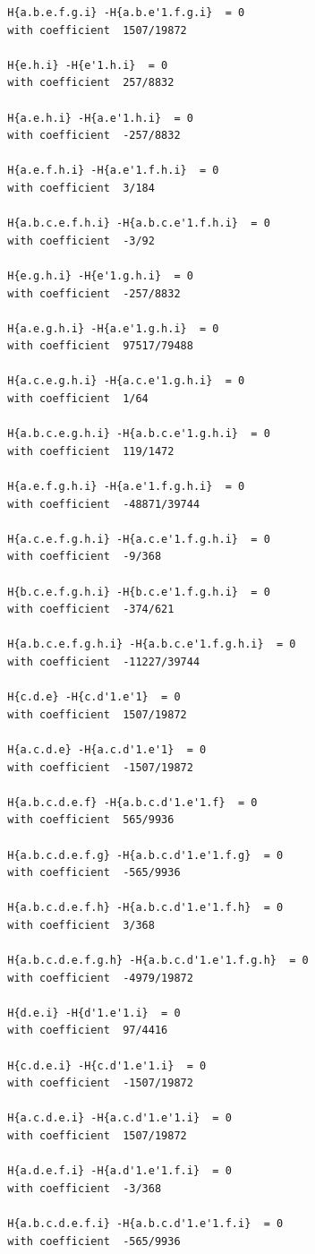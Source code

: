 \documentclass[11pt, a4paper]{kybernetika}
\begin{document}
\begin{verbatim}
		H{a.b.e.f.g.i} -H{a.b.e'1.f.g.i}  = 0
		with coefficient  1507/19872
		
		H{e.h.i} -H{e'1.h.i}  = 0
		with coefficient  257/8832
		
		H{a.e.h.i} -H{a.e'1.h.i}  = 0
		with coefficient  -257/8832
		
		H{a.e.f.h.i} -H{a.e'1.f.h.i}  = 0
		with coefficient  3/184
		
		H{a.b.c.e.f.h.i} -H{a.b.c.e'1.f.h.i}  = 0
		with coefficient  -3/92
		
		H{e.g.h.i} -H{e'1.g.h.i}  = 0
		with coefficient  -257/8832
		
		H{a.e.g.h.i} -H{a.e'1.g.h.i}  = 0
		with coefficient  97517/79488
		
		H{a.c.e.g.h.i} -H{a.c.e'1.g.h.i}  = 0
		with coefficient  1/64
		
		H{a.b.c.e.g.h.i} -H{a.b.c.e'1.g.h.i}  = 0
		with coefficient  119/1472
		
		H{a.e.f.g.h.i} -H{a.e'1.f.g.h.i}  = 0
		with coefficient  -48871/39744
		
		H{a.c.e.f.g.h.i} -H{a.c.e'1.f.g.h.i}  = 0
		with coefficient  -9/368
		
		H{b.c.e.f.g.h.i} -H{b.c.e'1.f.g.h.i}  = 0
		with coefficient  -374/621
		
		H{a.b.c.e.f.g.h.i} -H{a.b.c.e'1.f.g.h.i}  = 0
		with coefficient  -11227/39744
		
		H{c.d.e} -H{c.d'1.e'1}  = 0
		with coefficient  1507/19872
		
		H{a.c.d.e} -H{a.c.d'1.e'1}  = 0
		with coefficient  -1507/19872
		
		H{a.b.c.d.e.f} -H{a.b.c.d'1.e'1.f}  = 0
		with coefficient  565/9936
		
		H{a.b.c.d.e.f.g} -H{a.b.c.d'1.e'1.f.g}  = 0
		with coefficient  -565/9936
		
		H{a.b.c.d.e.f.h} -H{a.b.c.d'1.e'1.f.h}  = 0
		with coefficient  3/368
		
		H{a.b.c.d.e.f.g.h} -H{a.b.c.d'1.e'1.f.g.h}  = 0
		with coefficient  -4979/19872
		
		H{d.e.i} -H{d'1.e'1.i}  = 0
		with coefficient  97/4416
		
		H{c.d.e.i} -H{c.d'1.e'1.i}  = 0
		with coefficient  -1507/19872
		
		H{a.c.d.e.i} -H{a.c.d'1.e'1.i}  = 0
		with coefficient  1507/19872
		
		H{a.d.e.f.i} -H{a.d'1.e'1.f.i}  = 0
		with coefficient  -3/368
		
		H{a.b.c.d.e.f.i} -H{a.b.c.d'1.e'1.f.i}  = 0
		with coefficient  -565/9936
		

\end{verbatim}
\end{document}

